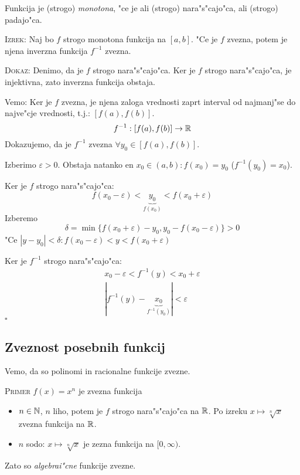 Funkcija  je (strogo) \emph{monotona}, "ce je ali (strogo) nara"s"cajo"ca, ali (strogo) padajo"ca.

\textsc{Izrek:} Naj bo $f$ strogo monotona funkcija na $[a, b]$. "Ce je $f$ zvezna, potem je njena inverzna funkcija $f^{-1}$ zvezna.

\textsc{Dokaz:} Denimo, da je $f$ strogo nara"s"cajo"ca. Ker je $f$ strogo nara"s"cajo"ca, je injektivna, zato inverzna funkcija obstaja.

Vemo: Ker je $f$ zvezna, je njena zaloga vrednosti zaprt interval od najmanj"se do najve"cje vrednosti, t.j.: $[f(a), f(b)]$.
\begin{equation*}
f^{-1}: [f(a), f(b)] \to \mathbb{R}
\end{equation*}
Dokazujemo, da je $f^{-1}$ zvezna $\forall y_0 \in [f(a), f(b)]$.

Izberimo $\varepsilon > 0$. Obstaja natanko en $x_0 \in (a, b): f(x_0) = y_0$ ($f^{-1}(y_0) = x_0$).

Ker je $f$ strogo nara"s"cajo"ca:
\begin{equation*}
f(x_0 - \varepsilon) < \underbrace{y_0}_{f(x_0)} < f(x_0 + \varepsilon)
\end{equation*}
Izberemo
\begin{equation*}
\delta = \min \{f(x_0+\varepsilon) - y_0, y_0 - f(x_0 - \varepsilon)\} > 0
\end{equation*}
"Ce $|y - y_0| < \delta : f(x_0 - \varepsilon) < y < f(x_0 + \varepsilon)$

Ker je $f^{-1}$ strogo nara"s"cajo"ca:
\begin{gather*}
x_0 - \varepsilon < f^{-1}(y) < x_0 + \varepsilon \\
|f^{-1}(y) - \underbrace{x_0}_{f^{-1}(y_0)}| < \varepsilon
\end{gather*}
\hfill $\square$
%
\subsection{Zveznost posebnih funkcij}
Vemo, da so polinomi in racionalne funkcije zvezne.

\textsc{Primer} $f(x) = x^n$ je zvezna funkcija
\begin{itemize}
	\item $n \in \mathbb{N}$, $n$ liho, potem je $f$ strogo nara"s"cajo"ca na $\mathbb{R}$. Po izreku $x \mapsto \sqrt[n]{x}$ zvezna funkcija na $\mathbb{R}$.

	\item $n$ sodo: $x \mapsto \sqrt[n]{x}$ je zezna funkcija na $[0, \infty)$.
\end{itemize}
Zato so \emph{algebrai"cne} funkcije zvezne.


